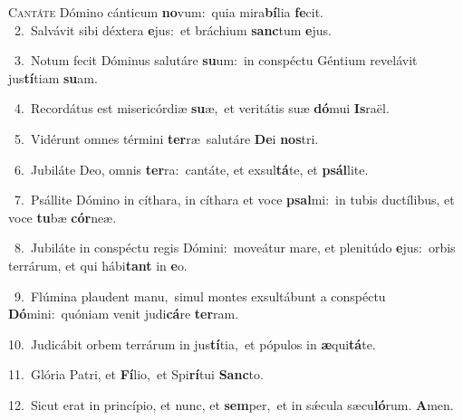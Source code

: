 \lettrine{\initial\textcolor{\initialcolor}{C}}{antáte} Dómino cánticum \textbf{no}\-vum:~\star quia mira\-\textbf{bí}\-lia \textbf{fe}\-cit.\\
{\numbfont\textcolor{\numbcolor}{~2.}}~Salvávit sibi déxtera \textbf{e}\-jus:~\star et bráchium \textbf{sanc}\-tum \textbf{e}\-jus.\par
{\numbfont\textcolor{\numbcolor}{~3.}}~Notum fecit Dóminus salutáre \textbf{su}\-um:~\star in conspéctu Géntium revelávit jus\-\textbf{tí}\-tiam \textbf{su}\-am.\par
{\numbfont\textcolor{\numbcolor}{~4.}}~Recordátus est misericórdiæ \textbf{su}\-æ,~\star et veritátis suæ \textbf{dó}\-mui \textbf{Is}\-raël.\par
{\numbfont\textcolor{\numbcolor}{~5.}}~Vidérunt omnes términi \textbf{ter}\-ræ~\star salutáre \textbf{De}\-i \textbf{nos}\-tri.\par
{\numbfont\textcolor{\numbcolor}{~6.}}~Jubiláte Deo, omnis \textbf{ter}\-ra:~\star cantáte, et exsul\-\textbf{tá}\-te, et \textbf{psál}\-lite.\par
{\numbfont\textcolor{\numbcolor}{~7.}}~Psállite Dómino in cíthara, in cíthara et voce \textbf{psal}\-mi:~\star in tubis ductílibus, et voce \textbf{tu}\-bæ \textbf{cór}\-neæ.\par
{\numbfont\textcolor{\numbcolor}{~8.}}~Jubiláte in conspéctu regis Dómini:~\dagger moveátur mare, et plenitúdo \textbf{e}\-jus:~\star orbis terrárum, et qui hábi\textbf{tant} in \textbf{e}\-o.\par
{\numbfont\textcolor{\numbcolor}{~9.}}~Flúmina plaudent manu,~\dagger simul montes exsultábunt a conspéctu \textbf{Dó}\-mini:~\star quóniam venit judi\-\textbf{cá}\-re \textbf{ter}\-ram.\par
{\numbfont\textcolor{\numbcolor}{10.}}~Judicábit orbem terrárum in jus\-\textbf{tí}\-tia,~\star et pópulos in \textbf{æ}\-qui\-\textbf{tá}\-te.\par
{\numbfont\textcolor{\numbcolor}{11.}}~Glória Patri, et \textbf{Fí}\-lio,~\star et Spi\-\textbf{rí}\-tui \textbf{Sanc}\-to.\par
{\numbfont\textcolor{\numbcolor}{12.}}~Sicut erat in princípio, et nunc, et \textbf{sem}\-per,~\star et in sǽcula sæcu\-\textbf{ló}\-rum. \textbf{A}\-men.\par
